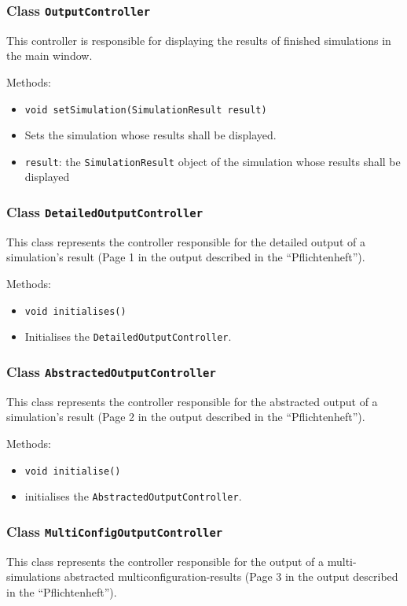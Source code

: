 \documentclass[parskip=full,11pt]{scrartcl}
\begin{document}
\subsubsection{Class \texttt{OutputController}}
This controller is responsible for displaying the results of finished simulations in the main window.

Methods:
\begin{itemize}\itemsep -10pt
	\item \texttt{void setSimulation(SimulationResult result)}
	\item[] Sets the simulation whose results shall be displayed.
	\item[] \texttt{result}: the \texttt{SimulationResult} object of the simulation whose results shall be displayed
	
\end{itemize}

\subsubsection{Class \texttt{DetailedOutputController}}
This class represents the controller responsible for the detailed output of a simulation's result (Page 1 in the output described in the \enquote{Pflichtenheft}).

Methods:
\begin{itemize}\itemsep -10pt
	\item \texttt{void initialises()}
	\item[] Initialises the \texttt{DetailedOutputController}.
\end{itemize}

\subsubsection{Class \texttt{AbstractedOutputController}}
This class represents the controller responsible for the abstracted output of a simulation's result (Page 2 in the output described in the \enquote{Pflichtenheft}).

Methods:
\begin{itemize}\itemsep -10pt
	\item \texttt{void initialise()}
	\item[] initialises the \texttt{AbstractedOutputController}.
\end{itemize}

\subsubsection{Class \texttt{MultiConfigOutputController}}
This class represents the controller responsible for the output of a multi-simulations abstracted multiconfiguration-results (Page 3 in the output described in the \enquote{Pflichtenheft}).
\end{document}
